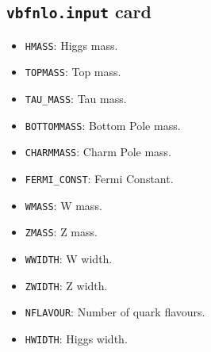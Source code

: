 \documentclass[12pt,a4]{article}
\begin{document}
\subsection{\texttt{vbfnlo.input} card}
\begin{itemize}
\item\texttt{HMASS}: Higgs mass.
  
\item\texttt{TOPMASS}: Top mass.
  
\item\texttt{TAU\_MASS}: Tau mass.
  
\item\texttt{BOTTOMMASS}: Bottom Pole mass.
  
\item\texttt{CHARMMASS}: Charm Pole mass.
  
\item\texttt{FERMI\_CONST}: Fermi Constant.
  
\item\texttt{WMASS}: W mass.
  
\item\texttt{ZMASS}: Z mass.
  
\item\texttt{WWIDTH}: W width.
  
\item\texttt{ZWIDTH}: Z width.
  
\item\texttt{NFLAVOUR}: Number of quark flavours.
  
\item\texttt{HWIDTH}: Higgs width.

\end{itemize}
\end{document}
